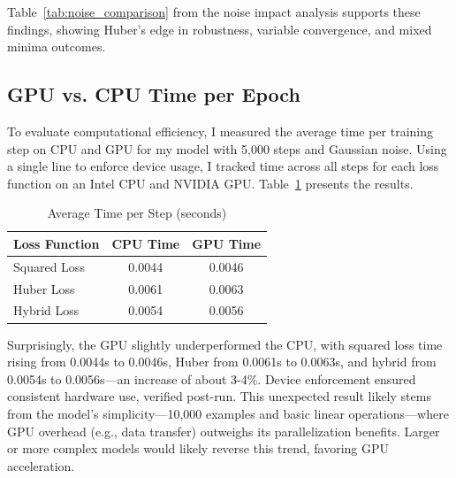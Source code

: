 \documentclass{article}
\begin{document}
Table~\ref{tab:noise_comparison} from the noise impact analysis supports these findings, showing Huber’s edge in robustness, variable convergence, and mixed minima outcomes.

\subsection{GPU vs. CPU Time per Epoch}

To evaluate computational efficiency, I measured the average time per training step on CPU and GPU for my model with 5,000 steps and Gaussian noise. Using a single line to enforce device usage, I tracked time across all steps for each loss function on an Intel CPU and NVIDIA GPU. Table~\ref{tab:time_comparison} presents the results.

\begin{table}[h]
    \centering
    \caption{Average Time per Step (seconds)}
    \label{tab:time_comparison}
    \begin{tabular}{lcc}
        \toprule
        \textbf{Loss Function} & \textbf{CPU Time} & \textbf{GPU Time} \\
        \midrule
        Squared Loss & 0.0044 & 0.0046 \\
        Huber Loss   & 0.0061 & 0.0063 \\
        Hybrid Loss  & 0.0054 & 0.0056 \\
        \bottomrule
    \end{tabular}
\end{table}

Surprisingly, the GPU slightly underperformed the CPU, with squared loss time rising from 0.0044s to 0.0046s, Huber from 0.0061s to 0.0063s, and hybrid from 0.0054s to 0.0056s—an increase of about 3-4\%. Device enforcement ensured consistent hardware use, verified post-run. This unexpected result likely stems from the model’s simplicity—10,000 examples and basic linear operations—where GPU overhead (e.g., data transfer) outweighs its parallelization benefits. Larger or more complex models would likely reverse this trend, favoring GPU acceleration.
\end{document}
